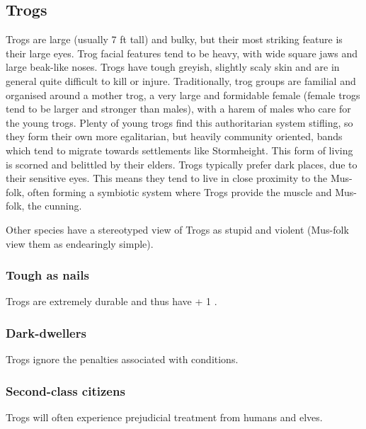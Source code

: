 \documentclass[a4paper,11pt,oneside]{book}
\newcommand{\textlf}[1]{\textbf{\titlecap{#1}}}
\begin{document}
\subsection{Trogs}
Trogs are large (usually 7 ft tall) and bulky, but their most striking feature is their large eyes. Trog facial features tend to be heavy, with wide square jaws and large beak-like noses. Trogs have tough greyish, slightly scaly skin and are in general quite difficult to kill or injure. Traditionally, trog groups are familial and organised around a mother trog, a very large and formidable female (female trogs tend to be larger and stronger than males), with a harem of males who care for the young trogs. Plenty of young trogs find this authoritarian system stifling, so they form their own more egalitarian, but heavily community oriented, bands which tend to migrate towards settlements like Stormheight. This form of living is scorned and belittled by their elders. Trogs typically prefer dark places, due to their sensitive eyes. This means they tend to live in close proximity to the Mus-folk, often forming a symbiotic system where Trogs provide the muscle and Mus-folk, the cunning.

Other species have a stereotyped view of Trogs as stupid and violent (Mus-folk view them as endearingly simple).  

\subsubsection*{Tough as nails}
Trogs are extremely durable and thus have + 1 \textlf{endurance}. 

\subsubsection*{Dark-dwellers}
Trogs ignore the penalties associated with \textlf{low light} conditions.

\subsubsection*{Second-class citizens}
Trogs will often experience prejudicial treatment from humans and elves.
\end{document}
